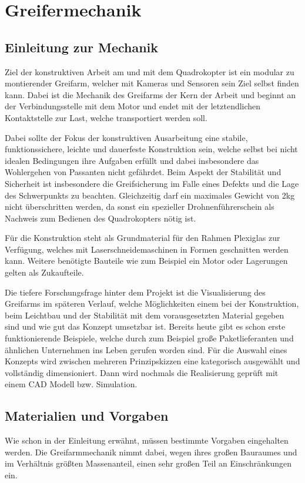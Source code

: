 \chapter{Greifermechanik}
\label{greifer}
\section{Einleitung zur Mechanik}
Ziel der konstruktiven Arbeit am und mit dem Quadrokopter ist ein modular zu montierender Greifarm, welcher mit Kameras und Sensoren sein Ziel selbst finden kann. Dabei ist die Mechanik des Greifarms der Kern der Arbeit und beginnt an der Verbindungsstelle mit dem Motor und endet mit der letztendlichen Kontaktstelle zur Last, welche transportiert werden soll.
\par
Dabei sollte der Fokus der konstruktiven Ausarbeitung eine stabile, funktionssichere, leichte und dauerfeste Konstruktion sein, welche selbst bei nicht idealen Bedingungen ihre Aufgaben erfüllt und dabei insbesondere das Wohlergehen von Passanten nicht gefährdet. Beim Aspekt der Stabilität und Sicherheit ist insbesondere die Greifsicherung im Falle eines Defekts und die Lage des Schwerpunkts zu beachten. Gleichzeitig darf ein maximales Gewicht von 2kg nicht überschritten werden, da sonst ein spezieller Drohnenführerschein als Nachweis zum Bedienen des Quadrokopters nötig ist.
\par 
Für die Konstruktion steht als Grundmaterial für den Rahmen Plexiglas zur Verfügung, welches mit Laserschneidemaschinen in Formen geschnitten werden kann. Weitere benötigte Bauteile wie zum Beispiel ein Motor oder Lagerungen gelten als Zukaufteile.
\par
Die tiefere Forschungsfrage hinter dem Projekt ist die Visualisierung des Greifarms im späteren Verlauf, welche Möglichkeiten einem bei der Konstruktion, beim Leichtbau und der Stabilität mit dem vorausgesetzten Material gegeben sind und wie gut das Konzept umsetzbar ist. Bereits heute gibt es schon erste funktionierende Beispiele, welche durch zum Beispiel große Paketlieferanten und ähnlichen Unternehmen ins Leben gerufen worden sind.
Für die Auswahl eines Konzepts wird zwischen mehreren Prinzipskizzen eine kategorisch ausgewählt und vollständig dimensioniert. Dann wird nochmals die Realisierung geprüft mit einem CAD Modell bzw. Simulation.

\section{Materialien und Vorgaben}
Wie schon in der Einleitung erwähnt, müssen bestimmte Vorgaben eingehalten werden. Die Greifarmmechanik nimmt dabei, wegen ihres großen Bauraumes und im Verhältnis größten Massenanteil, einen sehr großen Teil an Einschränkungen ein.

